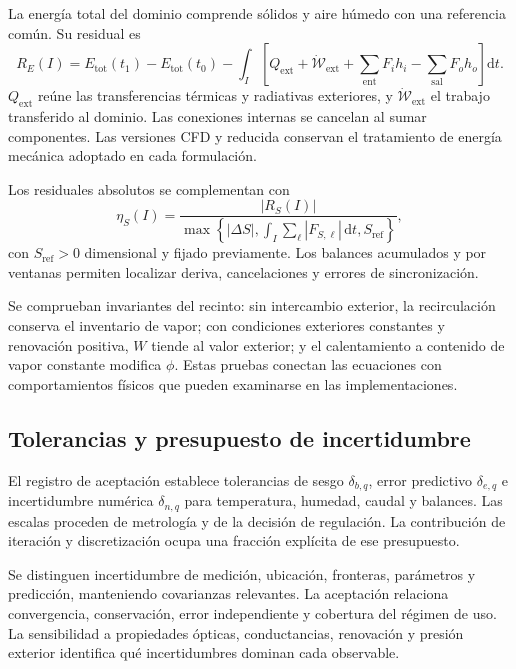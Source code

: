 La energía total del dominio comprende sólidos y aire húmedo con una referencia común. Su residual es
\begin{equation}
R_E(I)=E_{\mathrm{tot}}(t_1)-E_{\mathrm{tot}}(t_0)
-\int_I\left[Q_{\mathrm{ext}}+\dot{\mathcal W}_{\mathrm{ext}}
+\sum_{\mathrm{ent}}F_ih_i-\sum_{\mathrm{sal}}F_oh_o\right]\mathrm dt.
\label{met:residual_energia}
\end{equation}
$Q_{\mathrm{ext}}$ reúne las transferencias térmicas y radiativas exteriores, y $\dot{\mathcal W}_{\mathrm{ext}}$ el trabajo transferido al dominio. Las conexiones internas se cancelan al sumar componentes. Las versiones CFD y reducida conservan el tratamiento de energía mecánica adoptado en cada formulación.

Los residuales absolutos se complementan con
\begin{equation}
\eta_S(I)=\frac{|R_S(I)|}{\max\left\{|\Delta S|,
\int_I\sum_\ell|F_{S,\ell}|\,\mathrm dt,S_{\mathrm{ref}}\right\}},
\label{met:residual_normalizado}
\end{equation}
con $S_{\mathrm{ref}}>0$ dimensional y fijado previamente. Los balances acumulados y por ventanas permiten localizar deriva, cancelaciones y errores de sincronización.

Se comprueban invariantes del recinto: sin intercambio exterior, la recirculación conserva el inventario de vapor; con condiciones exteriores constantes y renovación positiva, $W$ tiende al valor exterior; y el calentamiento a contenido de vapor constante modifica $\phi$. Estas pruebas conectan las ecuaciones con comportamientos físicos que pueden examinarse en las implementaciones.

\subsection{Tolerancias y presupuesto de incertidumbre}

El registro de aceptación establece tolerancias de sesgo $\delta_{b,q}$, error predictivo $\delta_{e,q}$ e incertidumbre numérica $\delta_{n,q}$ para temperatura, humedad, caudal y balances. Las escalas proceden de metrología y de la decisión de regulación. La contribución de iteración y discretización ocupa una fracción explícita de ese presupuesto.

Se distinguen incertidumbre de medición, ubicación, fronteras, parámetros y predicción, manteniendo covarianzas relevantes. La aceptación relaciona convergencia, conservación, error independiente y cobertura del régimen de uso. La sensibilidad a propiedades ópticas, conductancias, renovación y presión exterior identifica qué incertidumbres dominan cada observable.

